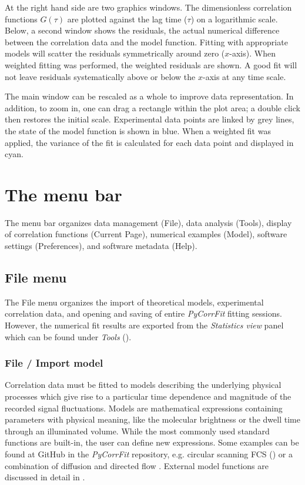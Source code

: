 At the right hand side are two graphics windows. The dimensionless correlation functions $G(\tau)$ are plotted against the lag time ($\tau$) on a logarithmic scale. Below, a second window shows the residuals, the actual numerical difference between the correlation data and the model function. Fitting with appropriate models will scatter the residuals symmetrically around zero ($x$-axis). When weighted fitting was performed, the weighted residuals are shown. A good fit will not leave residuals systematically above or below the $x$-axis at any time scale.

The main window can be rescaled as a whole to improve data representation. In addition, to zoom in, one can drag a rectangle within the plot area; a double click then restores the initial scale. Experimental data points are linked by grey lines, the state of the model function is shown in blue. When a weighted fit was applied, the variance of the fit is calculated for each data point and displayed in cyan.

\section{The menu bar}
\label{sec:menub}
The menu bar organizes data management (File), data analysis (Tools), display of correlation functions (Current Page), numerical examples (Model), software settings (Preferences), and software metadata (Help).

\subsection{File menu}
\label{sec:menub.filem}
The File menu organizes the import of theoretical models, experimental correlation data, and opening and saving of entire \textit{PyCorrFit} fitting sessions. However, the numerical fit results are exported from the \textit{Statistics view} panel which can be found under \textit{Tools} ().

\subsubsection{File / Import model}
\label{sec:menub.filem.impor}
Correlation data must be fitted to models describing the underlying physical processes which give rise to a particular time dependence and magnitude of the recorded signal fluctuations. Models are mathematical expressions containing parameters with physical meaning, like the molecular brightness or the dwell time through an illuminated volume. While the most commonly used standard functions are built-in, the user can define new expressions.
Some examples can be found at GitHub in the \textit{PyCorrFit} repository, e.g. circular scanning FCS \cite{Petrasek2008} () or a combination of diffusion and directed flow \cite{Brinkmeier1999}. External model functions are discussed in detail in .


